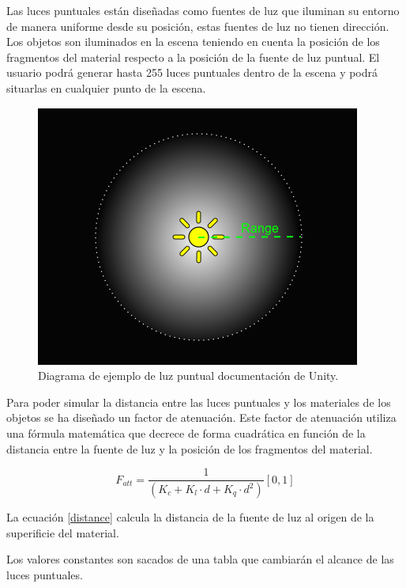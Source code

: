 \documentclass[a4paper, 17pt]{book}
\begin{document}
Las luces puntuales están diseñadas como fuentes de luz que iluminan su entorno de manera uniforme desde su posición, estas fuentes de
luz no tienen dirección. Los objetos son iluminados en la escena teniendo en cuenta la posición de los fragmentos del material respecto
a la posición de la fuente de luz puntual. El usuario podrá generar hasta 255 luces puntuales dentro de la escena y podrá situarlas en
cualquier punto de la escena.

\begin{figure}[H]
    \centering
    \includegraphics[scale=0.5, keepaspectratio]{img/PointLightDiagram.png}
    \caption{Diagrama de ejemplo de luz puntual documentación de Unity.}
    \label{figura:PointLightDiagram}
\end{figure}

Para poder simular la distancia entre las luces puntuales y los materiales de los objetos se ha diseñado un factor de atenuación. Este factor
de atenuación utiliza una fórmula matemática que decrece de forma cuadrática en función de la distancia entre la fuente de luz y la posición
de los fragmentos del material.

\begin{equation} \label{distance}
F_{att} = \frac{1} {(K_{c} + K_{l} \cdot d + K_{q} \cdot d^2)} [0 , 1]
\end{equation}

La ecuación \ref{distance} calcula la distancia de la fuente de luz al origen de la superificie del material.

\vspace{1mm} %

Los valores constantes son sacados de una tabla que cambiarán el alcance de las luces puntuales. 
\end{document}
